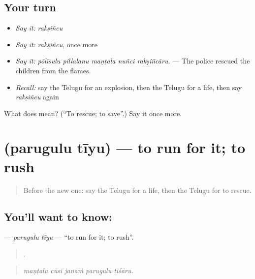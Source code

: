 \subsection*{Your turn}
\begin{itemize}
\raggedright
  \item \emph{Say it:} \emph{rakṣiñcu}
  \item \emph{Say it:} \emph{rakṣiñcu}, once more
  \item \emph{Say it:} \emph{pōlīsulu pillalanu maṇṭala nuñci rakṣiñcāru.} — The police rescued the children from the flames.
  \item \emph{Recall:} say the Telugu for an explosion, then the Telugu for a life, then say \emph{rakṣiñcu} again
\end{itemize}

\begin{tcolorbox}[breakable,colback=teal!4,colframe=teal!35!black,title={Before you move on}]
What does  mean? (\textquotedblleft{}To rescue; to save\textquotedblright{}.) Say it once more.
\end{tcolorbox}
\section[\texorpdfstring{\te{పరుగులు} \te{తీయు} (parugulu tīyu)}{పరుగులు తీయు (parugulu tīyu)}]{  (parugulu tīyu) — to run for it; to rush}

\label{lesson:TE-C331-parugulu-tiyu}



\begin{quote}
Before the new one: say the Telugu for a life, then the Telugu for to rescue.
\end{quote}

\subsection*{You'll want to know:  }
\textbf{ } — \emph{parugulu tīyu} — \textquotedblleft{}to run for it; to rush\textquotedblright{}.

\begin{quote}
    .
\end{quote}

\begin{quote}
\emph{maṇṭalu cūsi janaṁ parugulu tīśāru.}
\end{quote}

